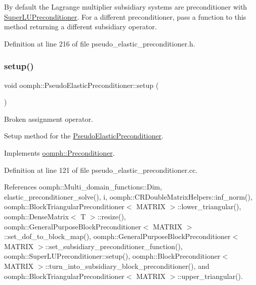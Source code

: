 By default the Lagrange multiplier subsidiary systems are preconditioner with \hyperlink{classoomph_1_1SuperLUPreconditioner}{Super\+L\+U\+Preconditioner}. For a different preconditioner, pass a function to this method returning a different subsidiary operator. 



Definition at line 216 of file pseudo\+\_\+elastic\+\_\+preconditioner.\+h.

\mbox{\label{classoomph_1_1PseudoElasticPreconditioner_a69909eef3e1530ca7faf48c653ec7327}} 
\subsubsection{\texorpdfstring{setup()}{setup()}}
{\footnotesize\ttfamily void oomph\+::\+Pseudo\+Elastic\+Preconditioner\+::setup (\begin{DoxyParamCaption}{ }\end{DoxyParamCaption})\hspace{0.3cm}{\ttfamily [virtual]}}



Broken assignment operator. 

Setup method for the \hyperlink{classoomph_1_1PseudoElasticPreconditioner}{Pseudo\+Elastic\+Preconditioner}. 

Implements \hyperlink{classoomph_1_1Preconditioner_af4886f4efe510e5c9b0eb19422943588}{oomph\+::\+Preconditioner}.



Definition at line 121 of file pseudo\+\_\+elastic\+\_\+preconditioner.\+cc.



References oomph\+::\+Multi\+\_\+domain\+\_\+functions\+::\+Dim, elastic\+\_\+preconditioner\+\_\+solve(), i, oomph\+::\+C\+R\+Double\+Matrix\+Helpers\+::inf\+\_\+norm(), oomph\+::\+Block\+Triangular\+Preconditioner$<$ M\+A\+T\+R\+I\+X $>$\+::lower\+\_\+triangular(), oomph\+::\+Dense\+Matrix$<$ T $>$\+::resize(), oomph\+::\+General\+Purpose\+Block\+Preconditioner$<$ M\+A\+T\+R\+I\+X $>$\+::set\+\_\+dof\+\_\+to\+\_\+block\+\_\+map(), oomph\+::\+General\+Purpose\+Block\+Preconditioner$<$ M\+A\+T\+R\+I\+X $>$\+::set\+\_\+subsidiary\+\_\+preconditioner\+\_\+function(), oomph\+::\+Super\+L\+U\+Preconditioner\+::setup(), oomph\+::\+Block\+Preconditioner$<$ M\+A\+T\+R\+I\+X $>$\+::turn\+\_\+into\+\_\+subsidiary\+\_\+block\+\_\+preconditioner(), and oomph\+::\+Block\+Triangular\+Preconditioner$<$ M\+A\+T\+R\+I\+X $>$\+::upper\+\_\+triangular().



